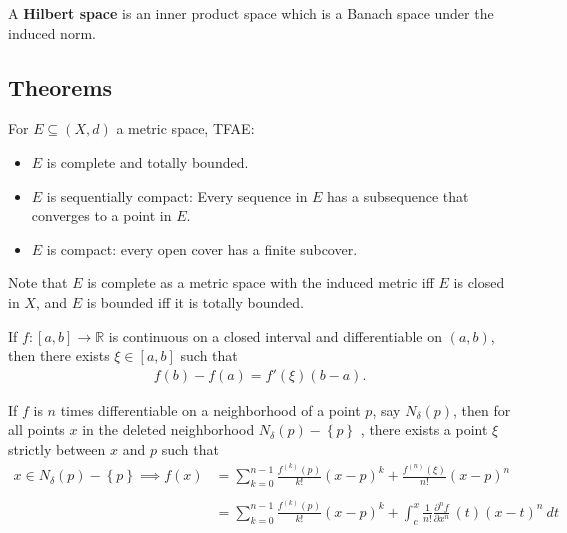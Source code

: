 \begin{definition}

A \textbf{Hilbert space} is an inner product space which is a Banach
space under the induced norm.

\end{definition}

\hypertarget{theorems}{%
\subsection{Theorems}\label{theorems}}

\begin{theorem}[Folland 0.25]

For \(E \subseteq (X, d)\) a metric space, TFAE:

\begin{itemize}
\tightlist
\item
  \(E\) is complete and totally bounded.
\item
  \(E\) is sequentially compact: Every sequence in \(E\) has a
  subsequence that converges to a point in \(E\).
\item
  \(E\) is compact: every open cover has a finite subcover.
\end{itemize}

Note that \(E\) is complete as a metric space with the induced metric
iff \(E\) is closed in \(X\), and \(E\) is bounded iff it is totally
bounded.

\end{theorem}

\begin{theorem}

If \(f: [a, b] \to {\mathbb{R}}\) is continuous on a closed interval and
differentiable on \((a, b)\), then there exists \(\xi \in [a, b]\) such
that
\begin{align*}
f(b) - f(a) = f'(\xi)(b-a)
.\end{align*}

\end{theorem}

\begin{theorem}

If \(f\) is \(n\) times differentiable on a neighborhood of a point
\(p\), say \(N_\delta(p)\), then for all points \(x\) in the deleted
neighborhood \(N_\delta(p) - \left\{{p}\right\}\) , there exists a point
\(\xi\) strictly between \(x\) and \(p\) such that
\begin{align*}
x \in N_\delta(p)-\left\{{p}\right\} \implies f(x) 
&= \sum_{k=0}^{n-1} \frac{f^{(k)}(p)}{k!}(x-p)^k + \frac{f^{(n)}(\xi)}{n!}(x-p)^n \\ \\
&= \sum_{k=0}^{n-1} \frac{f^{(k)}(p)}{k!}(x-p)^k + \int_c^x \frac{1}{n!} {\frac{\partial ^n f}{\partial x^n}\,}(t) (x-t)^n ~dt
\end{align*}

\end{theorem}

